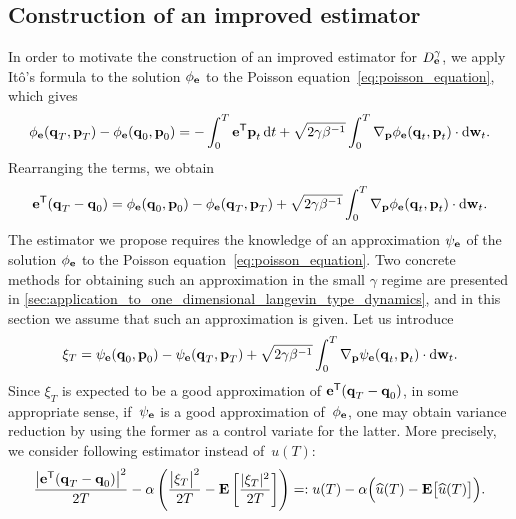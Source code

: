 \documentclass[11pt,a4paper]{article}
\begin{document}
\subsection{Construction of an improved estimator}%
\label{sub:construction_of_an_improved_estimator}
In order to motivate the construction of an improved estimator for $D^{\gamma}_{\boldsymbol{\mathbf e}}$,
we apply It\^o's formula to the solution $\phi_{\boldsymbol{\mathbf e}}$ to the Poisson equation~\eqref{eq:poisson_equation},
which gives
\[
    \phi_{\boldsymbol{\mathbf e}}(\boldsymbol{\mathbf q}_T, \boldsymbol{\mathbf p}_T) - \phi_{\boldsymbol{\mathbf e}}(\boldsymbol{\mathbf q}_0, \boldsymbol{\mathbf p}_0)
    = - \int_{0}^{T} \boldsymbol{\mathbf e}^\mathsf T \boldsymbol{\mathbf p}_t \, \mathrm d t + \sqrt{2 \gamma \beta^{-1}} \int_{0}^{T} \nabla_{\boldsymbol{\mathbf p}} \phi_{\boldsymbol{\mathbf e}}(\boldsymbol{\mathbf q}_t, \boldsymbol{\mathbf p}_t) \cdot \mathrm d \boldsymbol{\mathbf w}_t.
\]
Rearranging the terms,
we obtain
\begin{equation}
    \label{eq:ito_for_phi}
    \boldsymbol{\mathbf e}^\mathsf T(\boldsymbol{\mathbf q}_T - \boldsymbol{\mathbf q}_0) =
    \phi_{\boldsymbol{\mathbf e}}(\boldsymbol{\mathbf q}_0, \boldsymbol{\mathbf p}_0) - \phi_{\boldsymbol{\mathbf e}}(\boldsymbol{\mathbf q}_T, \boldsymbol{\mathbf p}_T)
    + \sqrt{2 \gamma \beta^{-1}} \int_{0}^{T} \nabla_{\boldsymbol{\mathbf p}} \phi_{\boldsymbol{\mathbf e}}(\boldsymbol{\mathbf q}_t, \boldsymbol{\mathbf p}_t) \cdot \mathrm d \boldsymbol{\mathbf w}_t.
\end{equation}
The estimator we propose requires the knowledge of an approximation $\psi_{\boldsymbol{\mathbf e}}$ of the solution $\phi_{\boldsymbol{\mathbf e}}$ to the Poisson equation~\eqref{eq:poisson_equation}.
Two concrete methods for obtaining such an approximation in the small $\gamma$ regime are presented in \cref{sec:application_to_one_dimensional_langevin_type_dynamics},
and in this section we assume that such an approximation is given.
Let us introduce
\begin{align}
    \label{eq:definition_control_variate}
    \xi_T = \psi_{\boldsymbol{\mathbf e}}(\boldsymbol{\mathbf q}_0, \boldsymbol{\mathbf p}_0) - \psi_{\boldsymbol{\mathbf e}}(\boldsymbol{\mathbf q}_T, \boldsymbol{\mathbf p}_T)
    + \sqrt{2 \gamma \beta^{-1}} \int_{0}^{T} \nabla_{\boldsymbol{\mathbf p}} \psi_{\boldsymbol{\mathbf e}}(\boldsymbol{\mathbf q}_t, \boldsymbol{\mathbf p}_t) \cdot \mathrm d \boldsymbol{\mathbf w}_t.
\end{align}
Since $\xi_T$ is expected to be a good approximation of $\boldsymbol{\mathbf e}^\mathsf T(\boldsymbol{\mathbf q}_T - \boldsymbol{\mathbf q}_0)$,
in some appropriate sense,
if~$\psi_{\boldsymbol{\mathbf e}}$ is a good approximation of~$\phi_{\boldsymbol{\mathbf e}}$,
one may obtain variance reduction by using the former as a control variate for the latter.
More precisely, we consider following estimator instead of~$u(T)$:
\begin{equation}
    \label{eq:simple_estimator_improvement_1}
     \frac{\bigl\lvert \boldsymbol{\mathbf e}^\mathsf T (\boldsymbol{\mathbf q}_T - \boldsymbol{\mathbf q}_0) \bigr\rvert^2}{2T}  -	\alpha  \left( \frac{\bigl\lvert \xi_T \bigr\rvert^2}{2T} - \mathbf{E} \left[ \frac{\lvert \xi_T \rvert^2}{2T} \right] \right)
    =: u(T) - \alpha \Bigl(\widehat u(T) - \mathbf{E} \bigl[\widehat u(T)\bigr]\Bigr).
\end{equation}
\end{document}
